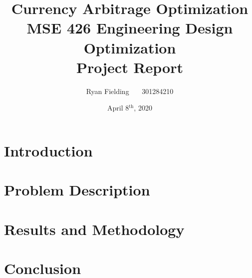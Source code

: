 \documentclass[12pt]{article}
\author{Ryan Fielding \ \ \ 301284210}
\title{\textbf{Currency Arbitrage Optimization\\}
\bigskip
\bigskip
MSE 426 Engineering Design Optimization\\Project Report
}
\date{April 8$^{\text{th}}$, 2020}
\begin{document}
\maketitle
\newpage
\tableofcontents
\listoffigures
\newpage

\section{Introduction}


\section{Problem Description}


\section{Results and Methodology}


\section{Conclusion}


\newpage
\nocite{*}


\end{document}
